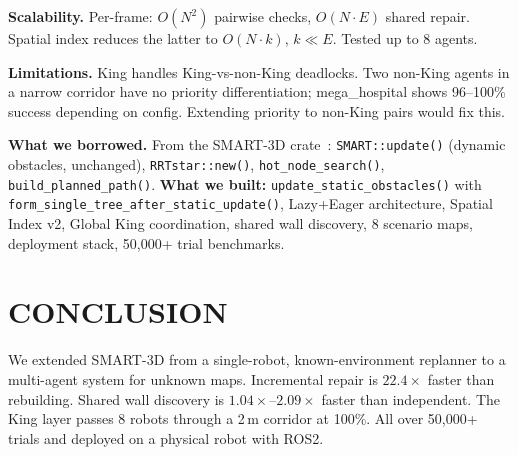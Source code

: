 \documentclass[letterpaper, 10pt, conference]{IEEEtran}
\newcommand{\smarttd}{SMART\nobreakdash-3D}
\begin{document}
\textbf{Scalability.} Per-frame: $O(N^2)$ pairwise checks, $O(N \cdot E)$ shared repair. Spatial index reduces the latter to $O(N \cdot k)$, $k \ll E$. Tested up to 8 agents.

\textbf{Limitations.} King handles King-vs-non-King deadlocks. Two non-King agents in a narrow corridor have no priority differentiation; mega\_hospital shows 96--100\% success depending on config. Extending priority to non-King pairs would fix this.

\textbf{What we borrowed.} From the \smarttd{} crate~\cite{agrawal2025smart3d}: \texttt{SMART::update()} (dynamic obstacles, unchanged), \texttt{RRTstar::new()}, \texttt{hot\_node\_search()}, \texttt{build\_planned\_path()}. \textbf{What we built:} \texttt{update\_static\_obstacles()} with \texttt{form\_single\_tree\_after\_static\_update()}, Lazy+Eager architecture, Spatial Index v2, Global King coordination, shared wall discovery, 8 scenario maps, deployment stack, 50{,}000+ trial benchmarks.

\section{CONCLUSION}

We extended \smarttd{} from a single-robot, known-environment replanner to a multi-agent system for unknown maps. Incremental repair is $22.4\times$ faster than rebuilding. Shared wall discovery is $1.04\times$--$2.09\times$ faster than independent. The King layer passes 8 robots through a 2\,m corridor at 100\%. All over 50{,}000+ trials and deployed on a physical robot with ROS2.



\end{document}
